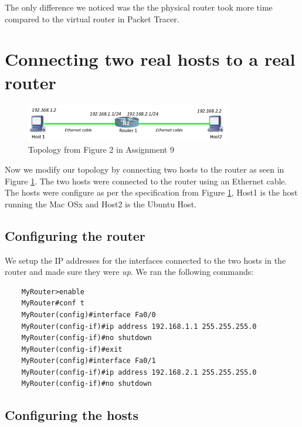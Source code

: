 \documentclass{article}
\begin{document}
The only difference we noticed was the the physical router took more time compared to the virtual router in Packet Tracer. 


\section{Connecting two real hosts to a real router}

\begin{figure}[h]
    \centering
    \includegraphics[width=0.8\textwidth]{2topo}
    \caption{Topology from Figure 2 in Assignment 9}
    \label{fig:2topo}
\end{figure}

Now we modify our topology by connecting two hosts to the router as seen in Figure \ref{fig:2topo}. The two hosts were connected to the router using an Ethernet cable.
The hosts were configure as per the specification from Figure \ref{fig:2topo}, Host1 is the host running the Mac OSx and Host2 is the Ubuntu Host.  

\subsection{Configuring the router}
We setup the IP addresses for the interfaces connected to the two hosts in the router and made sure they were \textit{up}. We ran the following commands:
\begin{verbatim}
    MyRouter>enable
    MyRouter#conf t
    MyRouter(config)#interface Fa0/0
    MyRouter(config-if)#ip address 192.168.1.1 255.255.255.0
    MyRouter(config-if)#no shutdown
    MyRouter(config-if)#exit
    MyRouter(config)#interface Fa0/1
    MyRouter(config-if)#ip address 192.168.2.1 255.255.255.0
    MyRouter(config-if)#no shutdown 
\end{verbatim}

\subsection{Configuring the hosts}
\end{document}
